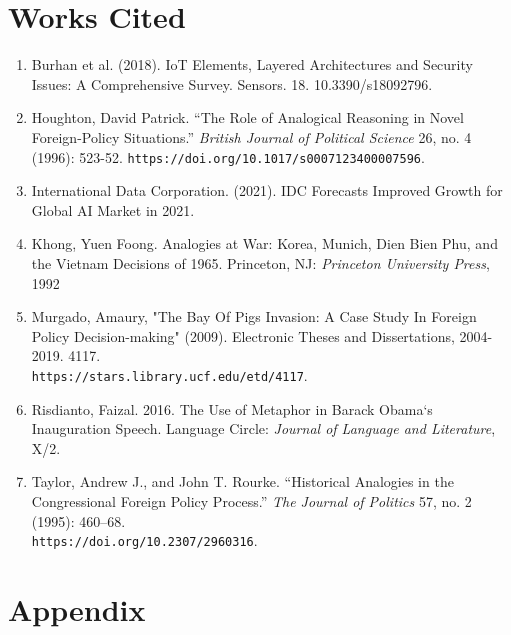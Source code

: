 \documentclass[12pt]{article}
\begin{document}
\section {Works Cited}
\begin {enumerate}
  \item Burhan et al. (2018). IoT Elements, Layered Architectures and Security Issues: A Comprehensive Survey. Sensors. 18. 10.3390/s18092796. 

  \item Houghton, David Patrick. “The Role of Analogical Reasoning in Novel Foreign-Policy Situations.” \textit{British Journal of Political Science} 26, no. 4 (1996): 523-52. \texttt{https://doi.org/10.1017/s0007123400007596}.

    \item International Data Corporation. (2021). IDC Forecasts Improved Growth for Global AI Market in 2021. 

    \item Khong, Yuen Foong. Analogies at War: Korea, Munich, Dien Bien Phu, and the Vietnam Decisions of 1965. Princeton, NJ: \textit{Princeton University Press}, 1992

    \item Murgado, Amaury, "The Bay Of Pigs Invasion: A Case Study In Foreign Policy Decision-making" (2009). Electronic Theses and Dissertations, 2004-2019. 4117.\\ \texttt{https://stars.library.ucf.edu/etd/4117}.

    \item Risdianto, Faizal. 2016. The Use of Metaphor in Barack Obama‘s Inauguration Speech. Language Circle: \textit{Journal of Language and Literature}, X/2.

    \item Taylor, Andrew J., and John T. Rourke. “Historical Analogies in the Congressional Foreign Policy Process.” \textit{The Journal of Politics} 57, no. 2 (1995): 460–68.\\ \texttt{https://doi.org/10.2307/2960316}. 

\end {enumerate}
\newpage
\section {Appendix}
\end{document}
